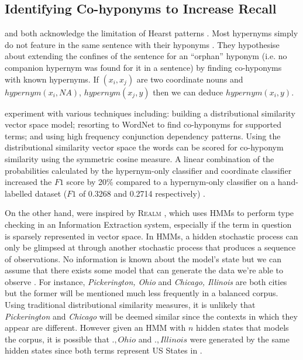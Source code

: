 \subsection{Identifying Co-hyponyms to Increase Recall}
\citep{Snow2004} and \citep{ritter2009anyway} both acknowledge the limitation of Hearst patterns \citep{hearst1992automatic}.  Most hypernyms simply do not feature in the same sentence with their hyponyms \citep{Snow2004, ritter2009anyway}.  They hypothesise about extending the confines of the sentence for an “orphan” hyponym (i.e. no companion hypernym was found for it in a sentence) by finding co-hyponyms with known hypernyms.  If $(x_i, x_j)$ are two coordinate nouns and $hypernym(x_i, NA)$, $hypernym(x_j, y)$ then we can deduce $hypernym(x_i, y)$.

\citeauthor{Snow2004} experiment with various techniques including: building a distributional similarity vector space model; resorting to WordNet to find co-hyponyms for supported terms; and using high frequency conjunction dependency patterns.  Using the distributional similarity vector space the words can be scored for co-hyponym similarity using the symmetric cosine measure.  A linear combination of the probabilities calculated by the hypernym-only classifier and coordinate classifier increased the $F1$ score by 20\% compared to a hypernym-only classifier on a hand-labelled dataset ($F1$ of 0.3268 and 0.2714 respectively) \citep{Snow2004}.

On the other hand, \citeauthor{ritter2009anyway} were inspired by \textsc{Realm} \citep{downey2007sparse}, which uses \ac{HMM}s to perform type checking in an Information Extraction system, especially if the term in question is sparsely represented in vector space.  In \ac{HMM}s, a hidden stochastic process can only be glimpsed at through another stochastic process that produces a sequence of observations.  No information is known about the model's state but we can assume that there exists some model that can generate the data we're able to observe \citep{rabiner1989tutorial}.  For instance, \textit{Pickerington, Ohio} and \textit{Chicago, Illinois} are both cities but the former will be mentioned much less frequently in a balanced corpus.  Using traditional distributional similarity measures, it is unlikely that \textit{Pickerington} and \textit{Chicago} will be deemed similar since the contexts in which they appear are different.  However given an \ac{HMM} with $n$ hidden states that models the corpus, it is possible that $., Ohio$ and $., Illinois$ were generated by the same hidden states since both terms represent US States \citep{downey2007sparse} in \citep{ritter2009anyway}.


